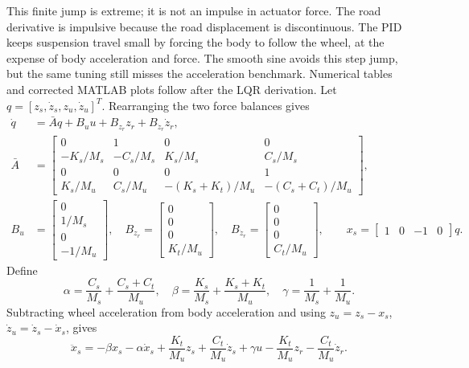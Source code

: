 This finite jump is extreme; it is not an impulse in actuator force. The road
derivative is impulsive because the road displacement is discontinuous.
The PID keeps suspension travel small by forcing the body to follow the wheel,
at the expense of body acceleration and force. The smooth sine avoids this step
jump, but the same tuning still misses the acceleration benchmark. Numerical
tables and corrected MATLAB plots follow after the LQR derivation.
\newpage
{}
Let $q=[z_s,\dot z_s,z_u,\dot z_u]^T$. Rearranging the two force balances gives
\begin{align}
 \dot q&=\bar A q+B_u u+B_{z_r}z_r+B_{\dot z_r}\dot z_r,\\
 \bar A&=\begin{bmatrix}
 0&1&0&0\\-K_s/M_s&-C_s/M_s&K_s/M_s&C_s/M_s\\
 0&0&0&1\\K_s/M_u&C_s/M_u&-(K_s+K_t)/M_u&-(C_s+C_t)/M_u
 \end{bmatrix},\\
 B_u&=\begin{bmatrix}0\\1/M_s\\0\\-1/M_u\end{bmatrix},\quad
 B_{z_r}=\begin{bmatrix}0\\0\\0\\K_t/M_u\end{bmatrix},\quad
 B_{\dot z_r}=\begin{bmatrix}0\\0\\0\\C_t/M_u\end{bmatrix},\qquad
 x_s=\begin{bmatrix}1&0&-1&0\end{bmatrix}q.
\end{align}
Define
\begin{equation}
 \alpha=\frac{C_s}{M_s}+\frac{C_s+C_t}{M_u},\quad
 \beta=\frac{K_s}{M_s}+\frac{K_s+K_t}{M_u},\quad
 \gamma=\frac1{M_s}+\frac1{M_u}.
\end{equation}
Subtracting wheel acceleration from body acceleration and using
$z_u=z_s-x_s$, $\dot z_u=\dot z_s-\dot x_s$, gives
\begin{equation}
 \ddot x_s=-\beta x_s-\alpha\dot x_s+\frac{K_t}{M_u}z_s
 +\frac{C_t}{M_u}\dot z_s+\gamma u-\frac{K_t}{M_u}z_r-\frac{C_t}{M_u}\dot z_r.
\end{equation}
